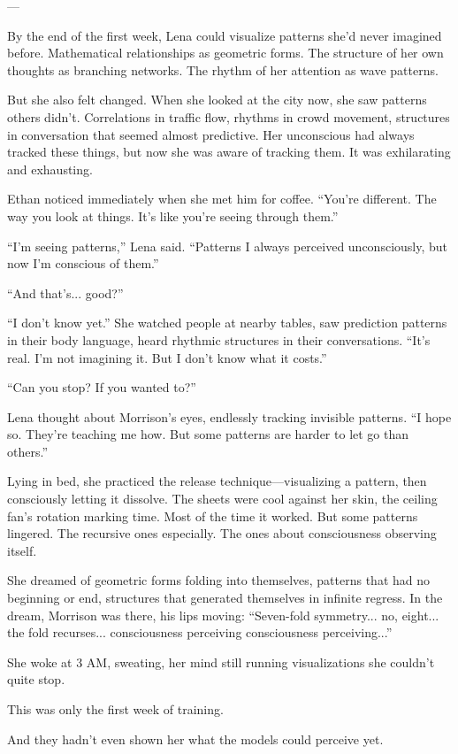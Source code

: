---

By the end of the first week, Lena could visualize patterns she'd never imagined before. Mathematical relationships as geometric forms. The structure of her own thoughts as branching networks. The rhythm of her attention as wave patterns.

But she also felt changed. When she looked at the city now, she saw patterns others didn't. Correlations in traffic flow, rhythms in crowd movement, structures in conversation that seemed almost predictive. Her unconscious had always tracked these things, but now she was aware of tracking them. It was exhilarating and exhausting.

Ethan noticed immediately when she met him for coffee. ``You're different. The way you look at things. It's like you're seeing through them.''

``I'm seeing patterns,'' Lena said. ``Patterns I always perceived unconsciously, but now I'm conscious of them.''

``And that's... good?''

``I don't know yet.'' She watched people at nearby tables, saw prediction patterns in their body language, heard rhythmic structures in their conversations. ``It's real. I'm not imagining it. But I don't know what it costs.''

``Can you stop? If you wanted to?''

Lena thought about Morrison's eyes, endlessly tracking invisible patterns. ``I hope so. They're teaching me how. But some patterns are harder to let go than others.''

Lying in bed, she practiced the release technique—visualizing a pattern, then consciously letting it dissolve. The sheets were cool against her skin, the ceiling fan's rotation marking time. Most of the time it worked. But some patterns lingered. The recursive ones especially. The ones about consciousness observing itself.

She dreamed of geometric forms folding into themselves, patterns that had no beginning or end, structures that generated themselves in infinite regress. In the dream, Morrison was there, his lips moving: ``Seven-fold symmetry... no, eight... the fold recurses... consciousness perceiving consciousness perceiving...''

She woke at 3 AM, sweating, her mind still running visualizations she couldn't quite stop.

This was only the first week of training.

And they hadn't even shown her what the models could perceive yet.
